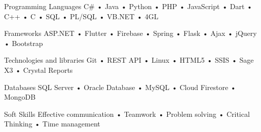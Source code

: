 

\begin{cvskills}
  \cvskill
    {Programming Languages} %
    {C\# • Java • Python • PHP • JavaScript • Dart • C++ • C • SQL • PL/SQL • VB.NET • 4GL} %

\end{cvskills}


\begin{cvskills}
  \cvskill
    {Frameworks} %
    {ASP.NET • Flutter • Firebase • Spring • Flask • Ajax • jQuery •  Bootstrap} %
\end{cvskills}


\begin{cvskills}
  \cvskill
    {Technologies and libraries} %
    {Git • REST API • Linux • HTML5 • SSIS • Sage X3 • Crystal Reports} %
\end{cvskills}


\begin{cvskills}
  \cvskill
    {Databases} %
    {SQL Server • Oracle Database • MySQL • Cloud Firestore • MongoDB} %
\end{cvskills}


\begin{cvskills}
  \cvskill
    {Soft Skills} %
    {Effective communication • Teamwork • Problem solving • Critical Thinking • Time management} %
\end{cvskills}